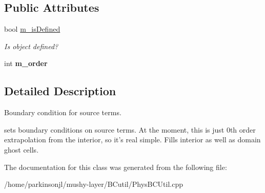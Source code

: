 \subsection*{Public Attributes}
\begin{DoxyCompactItemize}
\item 
\hypertarget{class_extrapolation_b_c_function_a64590e6d6c7e4182ab3c5c9079620af3}{bool \hyperlink{class_extrapolation_b_c_function_a64590e6d6c7e4182ab3c5c9079620af3}{m\-\_\-is\-Defined}}\label{class_extrapolation_b_c_function_a64590e6d6c7e4182ab3c5c9079620af3}

\begin{DoxyCompactList}\small\item\em Is object defined? \end{DoxyCompactList}\item 
\hypertarget{class_extrapolation_b_c_function_a9fda57684ad22edeee9fb5c3b98a1469}{int {\bfseries m\-\_\-order}}\label{class_extrapolation_b_c_function_a9fda57684ad22edeee9fb5c3b98a1469}

\end{DoxyCompactItemize}


\subsection{Detailed Description}
Boundary condition for source terms. 

sets boundary conditions on source terms. At the moment, this is just 0th order extrapolation from the interior, so it's real simple. Fills interior as well as domain ghost cells. 

The documentation for this class was generated from the following file\-:\begin{DoxyCompactItemize}
\item 
/home/parkinsonjl/mushy-\/layer/\-B\-Cutil/Phys\-B\-C\-Util.\-cpp\end{DoxyCompactItemize}
